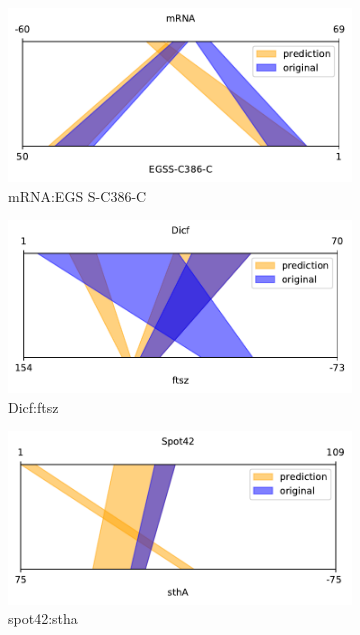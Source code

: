 \documentclass[twoside,a4paper]{report}
\begin{document}
\begin{figure}
		\begin{subfigure}{.5\textwidth}
			\centering
			\includegraphics[width=.9\linewidth]{rricomparison5}
			\caption{mRNA:EGS S-C386-C}
			\label{fig:rricomparison5}
		\end{subfigure}
		\begin{subfigure}{.5\textwidth}
			\centering
			\includegraphics[width=.9\linewidth]{rricomparison3}
			\caption{Dicf:ftsz}
			\label{fig:rricomparison3}
		\end{subfigure}%
	\begin{subfigure}{.5\textwidth}
		\centering
		\includegraphics[width=.9\linewidth]{rricomparison2}
		\caption{spot42:stha}
		\label{fig:rricomparison2}
	\end{subfigure}
\begin{subfigure}{.5\textwidth}

\end{subfigure}
\end{figure}
\end{document}
